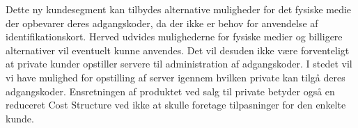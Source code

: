 Dette ny kundesegment kan tilbydes alternative muligheder for det fysiske medie der opbevarer deres adgangskoder, da der ikke er behov for anvendelse af identifikationskort.
Herved udvides mulighederne for fysiske medier og billigere alternativer vil eventuelt kunne anvendes.
Det vil desuden ikke være forventeligt at private kunder opstiller servere til administration af adgangskoder.
I stedet vil vi have mulighed for opstilling af server igennem hvilken private kan tilgå deres adgangskoder.
Ensretningen af produktet ved salg til private betyder også en reduceret Cost Structure ved ikke at skulle foretage tilpasninger for den enkelte kunde.



